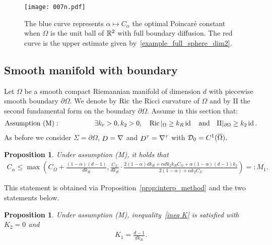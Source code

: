 \documentclass[a4paper]{article}
\newtheorem{proposition}[theorem]{Proposition}
\theoremstyle{definition}
\numberwithin{equation}{section}
\begin{document}
\begin{figure}[h]\label{fig:graphs}
\centering
  \texttt{[image: 007n.pdf]}
  \caption{The blue curve represents $\alpha \mapsto C_\alpha$ the optimal Poincaré constant when $\Omega$ is the unit ball of $\mathbb{R}^2$ with full boundary diffusion. The red curve is the upper estimate given by~\eqref{example_full_sphere_dim2}.}
  \label{fig:full_sphere}
\end{figure}


\subsection{Smooth manifold with boundary}
\label{sec:smooth_manifolds}

Let $\Omega$ be a smooth compact Riemannian manifold of dimension $d$ with piecewise smooth boundary $\partial \Omega$. We denote by $\operatorname{Ric}$ the Ricci curvature of $\Omega$ and by $\mathrm{II}$ the second fundamental form on the boundary $\partial \Omega$. Assume in this section that:
\begin{align*}
\text{Assumption (M)}: \quad \quad \quad  \quad \quad \exists k_r>0, k_2>0, \quad
\operatorname{Ric}|_{\Omega}\geq k_R \operatorname{id} \quad \text{and} \quad \mathrm{II}|_{\partial \Omega} \geq k_2 \operatorname{id}. 
\end{align*}
As before we consider $\Sigma=\partial\Omega$, $\mathop D=\nabla$ and ${\mathop D}^\tau= \nabla^\tau$ with $\mathcal {D}_0=C^1(\overline \Omega)$.


\begin{proposition}
Under assumption (M), it holds that
\begin{align}
\label{def_M1}
 C_\alpha \leq
\max \left(
C_\Omega + \frac{(1-\alpha)(d-1)}{d k_R} ,
\frac{C_\Sigma}{d k_R}\cdot \frac{2(1-\alpha) dk_R +\alpha d k_2 k_R C_\Omega +\alpha(1-\alpha)(d-1)k_2 }{2(1-\alpha)+\alpha  k_2 C_{\Sigma}} \right)=:M_1.
\end{align}
\end{proposition}



This statement is obtained via Proposition~\ref{prop:interp_method} and the two statements below.


\begin{proposition} \label{prop:K_one_manif}
Under assumption (M), inequality~\eqref{ineq K} is satisfied with $K_2=0$ and
\begin{align*}
K_1 = \frac{d-1}{d k_R}. 
\end{align*}
\end{proposition}
\end{document}
